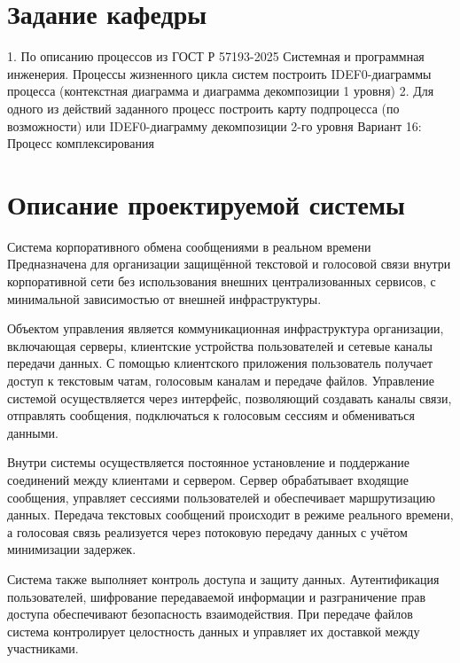 \thispagestyle{empty}

\newpage
\tableofcontents
\newpage

\section{Задание кафедры}
\begin{sloppypar}
    1. По описанию процессов из ГОСТ Р 57193-2025 Системная и программная инженерия. Процессы жизненного цикла систем построить IDEF0-диаграммы процесса (контекстная диаграмма и диаграмма декомпозиции 1 уровня)
    2. Для одного из действий заданного процесс построить карту подпроцесса (по возможности) или IDEF0-диаграмму декомпозиции 2-го уровня
Вариант 16: Процесс комплексирования
\end{sloppypar}

\section{Описание проектируемой системы}

Система корпоративного обмена сообщениями в реальном времени
Предназначена для организации защищённой текстовой и голосовой связи внутри корпоративной сети без использования внешних централизованных сервисов, с минимальной зависимостью от внешней инфраструктуры.

Объектом управления является коммуникационная инфраструктура организации, включающая серверы, клиентские устройства пользователей и сетевые каналы передачи данных. С помощью клиентского приложения пользователь получает доступ к текстовым чатам, голосовым каналам и передаче файлов. Управление системой осуществляется через интерфейс, позволяющий создавать каналы связи, отправлять сообщения, подключаться к голосовым сессиям и обмениваться данными.

Внутри системы осуществляется постоянное установление и поддержание соединений между клиентами и сервером. Сервер обрабатывает входящие сообщения, управляет сессиями пользователей и обеспечивает маршрутизацию данных. Передача текстовых сообщений происходит в режиме реального времени, а голосовая связь реализуется через потоковую передачу данных с учётом минимизации задержек.

Система также выполняет контроль доступа и защиту данных. Аутентификация пользователей, шифрование передаваемой информации и разграничение прав доступа обеспечивают безопасность взаимодействия. При передаче файлов система контролирует целостность данных и управляет их доставкой между участниками.


